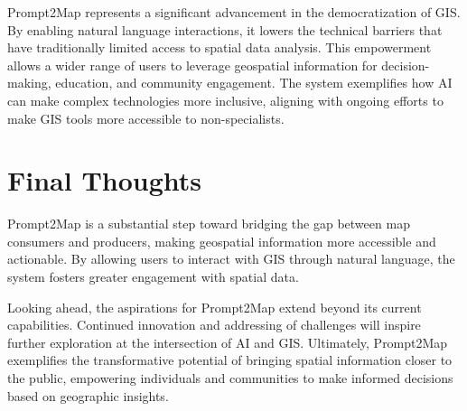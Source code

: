 Prompt2Map represents a significant advancement in the democratization of GIS. By enabling natural language interactions, it lowers the technical barriers that have traditionally limited access to spatial data analysis. This empowerment allows a wider range of users to leverage geospatial information for decision-making, education, and community engagement. The system exemplifies how AI can make complex technologies more inclusive, aligning with ongoing efforts to make GIS tools more accessible to non-specialists.

\section{Final Thoughts}

Prompt2Map is a substantial step toward bridging the gap between map consumers and producers, making geospatial information more accessible and actionable. By allowing users to interact with GIS through natural language, the system fosters greater engagement with spatial data.

Looking ahead, the aspirations for Prompt2Map extend beyond its current capabilities. Continued innovation and addressing of challenges will inspire further exploration at the intersection of AI and GIS. Ultimately, Prompt2Map exemplifies the transformative potential of bringing spatial information closer to the public, empowering individuals and communities to make informed decisions based on geographic insights.
